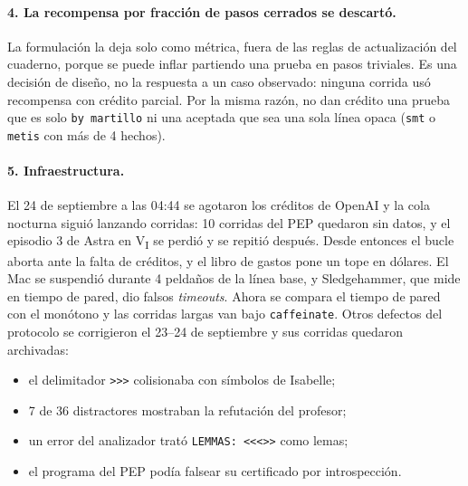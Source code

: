 \documentclass[11pt]{article}
\theoremstyle{remark}
\begin{document}
\paragraph{4. La recompensa por fracción de pasos cerrados se descartó.} La formulación la deja solo como métrica, fuera de las reglas de actualización del cuaderno, porque se puede inflar partiendo una prueba en pasos triviales. Es una decisión de diseño, no la respuesta a un caso observado: ninguna corrida usó recompensa con crédito parcial. Por la misma razón, no dan crédito una prueba que es solo \texttt{by martillo} ni una aceptada que sea una sola línea opaca (\texttt{smt} o \texttt{metis} con más de 4 hechos).

\paragraph{5. Infraestructura.} El 24 de septiembre a las 04:44 se agotaron los créditos de OpenAI y la cola nocturna siguió lanzando corridas: 10 corridas del PEP quedaron sin datos, y el episodio 3 de Astra en V\textsubscript{I} se perdió y se repitió después. Desde entonces el bucle aborta ante la falta de créditos, y el libro de gastos pone un tope en dólares. El Mac se suspendió durante 4 peldaños de la línea base, y Sledgehammer, que mide en tiempo de pared, dio falsos \emph{timeouts}. Ahora se compara el tiempo de pared con el monótono y las corridas largas van bajo \texttt{caffeinate}. Otros defectos del protocolo se corrigieron el 23--24 de septiembre y sus corridas quedaron archivadas:
\begin{itemize}[nosep]
\item el delimitador \texttt{>{}>{}>} colisionaba con símbolos de Isabelle;
\item 7 de 36 distractores mostraban la refutación del profesor;
\item un error del analizador trató \texttt{LEMMAS: <{}<{}<{}>{}>} como lemas;
\item el programa del PEP podía falsear su certificado por introspección.
\end{itemize}
\end{document}
